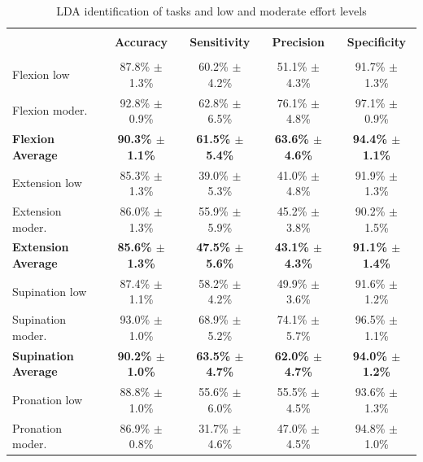 \begin{table}[]
\centering
\caption{LDA identification of tasks and low and moderate effort levels}
\label{tb:2-6}
\begin{tabular}{lcccc}
 & & & &\\
                            & \textbf{Accuracy}           & \textbf{Sensitivity}        & \textbf{Precision}          & \textbf{Specificity}        \\ \hline
                            &                             &                             &                             &                             \\
Flexion low                 & 87.8\% $\pm$ 1.3\%          & 60.2\% $\pm$ 4.2\%          & 51.1\% $\pm$ 4.3\%          & 91.7\% $\pm$ 1.3\%          \\
Flexion moder.              & 92.8\% $\pm$ 0.9\%          & 62.8\% $\pm$ 6.5\%          & 76.1\% $\pm$ 4.8\%          & 97.1\% $\pm$ 0.9\%          \\
\textbf{Flexion Average}    & \textbf{90.3\% $\pm$ 1.1\%} & \textbf{61.5\% $\pm$ 5.4\%} & \textbf{63.6\% $\pm$ 4.6\%} & \textbf{94.4\% $\pm$ 1.1\%} \\
Extension low               & 85.3\% $\pm$ 1.3\%          & 39.0\% $\pm$ 5.3\%          & 41.0\% $\pm$ 4.8\%          & 91.9\% $\pm$ 1.3\%          \\
Extension moder.            & 86.0\% $\pm$ 1.3\%          & 55.9\% $\pm$ 5.9\%          & 45.2\% $\pm$ 3.8\%          & 90.2\% $\pm$ 1.5\%          \\
\textbf{Extension Average}  & \textbf{85.6\% $\pm$ 1.3\%} & \textbf{47.5\% $\pm$ 5.6\%} & \textbf{43.1\% $\pm$ 4.3\%} & \textbf{91.1\% $\pm$ 1.4\%} \\
Supination low              & 87.4\% $\pm$ 1.1\%          & 58.2\% $\pm$ 4.2\%          & 49.9\% $\pm$ 3.6\%          & 91.6\% $\pm$ 1.2\%          \\
Supination moder.           & 93.0\% $\pm$ 1.0\%          & 68.9\% $\pm$ 5.2\%          & 74.1\% $\pm$ 5.7\%          & 96.5\% $\pm$ 1.1\%          \\
\textbf{Supination Average} & \textbf{90.2\% $\pm$ 1.0\%} & \textbf{63.5\% $\pm$ 4.7\%} & \textbf{62.0\% $\pm$ 4.7\%} & \textbf{94.0\% $\pm$ 1.2\%} \\
Pronation low               & 88.8\% $\pm$ 1.0\%          & 55.6\% $\pm$ 6.0\%          & 55.5\% $\pm$ 4.5\%          & 93.6\% $\pm$ 1.3\%          \\
Pronation moder.            & 86.9\% $\pm$ 0.8\%          & 31.7\% $\pm$ 4.6\%          & 47.0\% $\pm$ 4.5\%          & 94.8\% $\pm$ 1.0\%          \\

\end{tabular}
\end{table}
